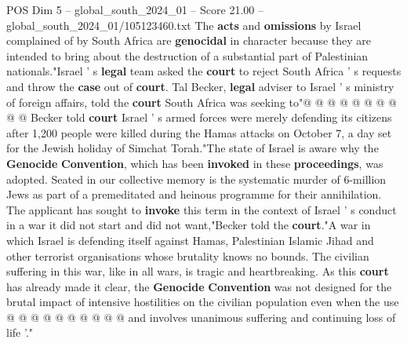 \begin{textsample}{POS Dim 5 – global\_south\_2024\_01 – Score 21.00 – global\_south\_2024\_01/105123460.txt}
The \textbf{acts} and \textbf{omissions} by Israel complained of by South Africa are \textbf{genocidal} in character because they are intended to bring about the destruction of a substantial part of Palestinian nationals."Israel ' s \textbf{legal} team asked the \textbf{court} to reject South Africa ' s requests and throw the \textbf{case} out of \textbf{court}.
Tal Becker, \textbf{legal} adviser to Israel ' s ministry of foreign affairs, told the \textbf{court} South Africa was seeking to"@ @ @ @ @ @ @ @ @ @ Becker told \textbf{court} Israel ' s armed forces were merely defending its citizens after 1,200 people were killed during the Hamas attacks on October 7, a day set for the Jewish holiday of Simchat Torah."The state of Israel is aware why the \textbf{Genocide} \textbf{Convention}, which has been \textbf{invoked} in these \textbf{proceedings}, was adopted.
Seated in our collective memory is the systematic murder of 6-million Jews as part of a premeditated and heinous programme for their annihilation.
The applicant has sought to \textbf{invoke} this term in the context of Israel ' s conduct in a war it did not start and did not want,"Becker told the \textbf{court}."A war in which Israel is defending itself against Hamas, Palestinian Islamic Jihad and other terrorist organisations whose brutality knows no bounds.
The civilian suffering in this war, like in all wars, is tragic and heartbreaking.
As this \textbf{court} has already made it clear, the \textbf{Genocide} \textbf{Convention} was not designed for the brutal impact of intensive hostilities on the civilian population even when the use @ @ @ @ @ @ @ @ @ @ and involves unanimous suffering and continuing loss of life '."

\end{textsample}
